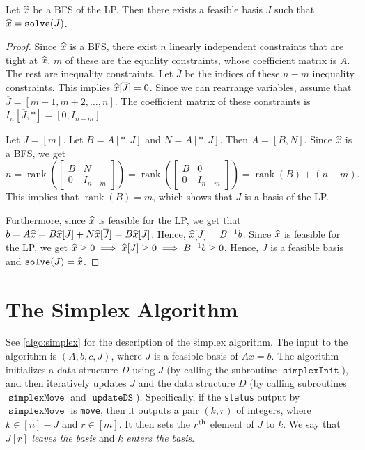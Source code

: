 \documentclass[a4paper, 12pt, fleqn]{article}
\newcommand*{\Jcomp}{\overline{J}}
\DeclareMathOperator{\rank}{rank}
\DeclareMathOperator{\solve}{\mathtt{solve}}
\DeclareMathOperator{\simplexInit}{\mathtt{simplexInit}}
\DeclareMathOperator{\simplexMove}{\mathtt{simplexMove}}
\DeclareMathOperator{\updateDS}{\mathtt{updateDS}}
\newenvironment*{longProof}{\begin{proof}}{\end{proof}}
\begin{document}
\begin{lemma}
\label{thm:bfs-gives-basis}
Let $\widehat{x}$ be a BFS of the LP. Then there exists a feasible basis $J$
such that $\xhat = \solve(J)$.
\end{lemma}
\begin{longProof}
Since $\widehat{x}$ is a BFS, there exist $n$ linearly independent constraints that are tight at $\widehat{x}$.
$m$ of these are the equality constraints, whose coefficient matrix is $A$.
The rest are inequality constraints.
Let $\Jcomp$ be the indices of these $n-m$ inequality constraints.
This implies $\xhat[\Jcomp] = 0$.
Since we can rearrange variables, assume \wLoG{} that $\Jcomp = [m+1, m+2, \ldots, n]$.
The coefficient matrix of these constraints is $I_n[\Jcomp,*] = [0, I_{n-m}]$.

Let $J = [m]$. Let $B = A[*,J]$ and $N = A[*,J]$. Then $A = [B, N]$. Since $\widehat{x}$ is a BFS, we get
\[ n = \rank\left(\begin{bmatrix}B & N \\ 0 & I_{n-m}\end{bmatrix}\right)
= \rank\left(\begin{bmatrix}B & 0 \\ 0 & I_{n-m}\end{bmatrix}\right)
= \rank(B) + (n-m). \]
This implies that $\rank(B) = m$, which shows that $J$ is a basis of the LP.

Furthermore, since $\widehat{x}$ is feasible for the LP, we get that
$b = A\xhat = B\xhat[J] + N\xhat[\Jcomp] = B\xhat[J]$.
Hence, $\widehat{x}[J] = B^{-1}b$. Since $\widehat{x}$ is feasible for the LP,
we get $\widehat{x} \ge 0 \implies \widehat{x}[J] \ge 0 \implies B^{-1}b \ge 0$.
Hence, $J$ is a feasible basis and $\solve(J) = \xhat$.
\end{longProof}

\section{The Simplex Algorithm}

See \cref{algo:simplex} for the description of the simplex algorithm.
The input to the algorithm is $(A, b, c, J)$, where $J$ is a feasible basis of $Ax = b$.
The algorithm initializes a data structure $D$ using $J$
(by calling the subroutine $\simplexInit$),
and then iteratively updates $J$ and the data structure $D$
(by calling subroutines $\simplexMove$ and $\updateDS$).
Specifically, if the \texttt{status} output by $\simplexMove$ is \texttt{move},
then it outputs a pair $(k, r)$ of integers, where $k \in [n] - J$ and $r \in [m]$.
It then sets the $r^{\textrm{th}}$ element of $J$ to $k$.
We say that $J[r]$ \emph{leaves the basis} and $k$ \emph{enters the basis}.
\end{document}
